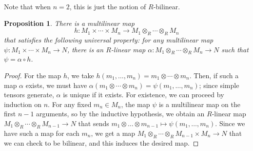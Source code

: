 \documentclass{amsart}[12pt]
\numberwithin{equation}{section}
\theoremstyle{plain} %
\newtheorem{prop}[equation]{Proposition}
\theoremstyle{definition}
\theoremstyle{remark}
\begin{document}
Note that when $n=2$, this is just the notion of $R$-bilinear. 

\begin{prop} There is a multilinear map
\[ h: M_1 \times \cdots \times M_n \to M_1 \otimes_R \cdots  \otimes_R M_n \] that satisfies the following universal property: for any multilinear map $\psi: M_1 \times \cdots \times M_n \to N$, there is an $R$-linear map $\alpha: M_1 \otimes_R \cdots  \otimes_R M_n \to N$ such that $\psi = \alpha\circ h$.
\end{prop}

\begin{proof}
 For the map $h$, we take $h(m_1,\dots,m_n) = m_1\otimes \cdots \otimes m_n$. Then, if such a map $\alpha$ exists, we must have $\alpha(m_1\otimes\cdots\otimes m_n)= \psi(m_1,\dots,m_n)$; since simple tensors generate, $\alpha$ is unique if it exists. For existence, we can proceed by induction on $n$. For any fixed $m_n\in M_n$, the map $\psi$ is a multilinear map on the first $n-1$ arguments, so by the inductive hypothesis, we obtain an $R$-linear map $M_1 \otimes_R \cdots  \otimes_R M_{n-1} \to N$ that sends $m_1\otimes \dots \otimes m_{n-1} \mapsto \psi(m_1,\dots,m_n)$. Since we have such a map for each $m_n$, we get a map $M_1 \otimes_R \cdots  \otimes_R M_{n-1} \times M_n \to N$ that we can check to be bilinear, and this induces the desired map.
\end{proof}
\end{document}
